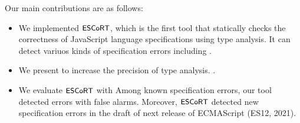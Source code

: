 Our main contributions are as follows:
\begin{itemize}
  \item We implemented $\textsf{\small ESCoRT}$, which is the first tool that statically checks the
    correctness of JavaScript language specifications using type analysis.  It
    can detect variuos kinds of specification errors including .
  \item We present  to increase the precision of type analysis.
    \inred{$\cdots$}.
  \item We evaluate $\textsf{\small ESCoRT}$ with  Among 
    known specification errors, our tool detected  errors with
     false alarms.  Moreover, $\textsf{\small ESCoRT}$ detected  new
    specification errors in the draft of next release of ECMAScript (ES12,
    2021).
\end{itemize}

